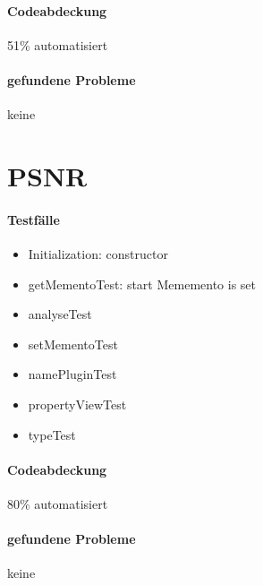 \paragraph*{Codeabdeckung}
51\% automatisiert

\paragraph*{gefundene Probleme}
keine

\section{PSNR}
\paragraph*{Testfälle}
\begin{itemize}
\item Initialization: constructor
\item getMementoTest: start Mememento is set
\item analyseTest
\item setMementoTest
\item namePluginTest
\item propertyViewTest
\item typeTest
\end{itemize}

\paragraph*{Codeabdeckung}
80\% automatisiert

\paragraph*{gefundene Probleme}
keine